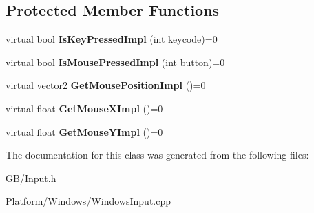 \subsection*{Protected Member Functions}
\begin{DoxyCompactItemize}
\item 
\mbox{\label{class_g_b_1_1_input_a0fa41d7075dbd87cc4cb9420c7758c8b}} 
virtual bool {\bfseries Is\+Key\+Pressed\+Impl} (int keycode)=0
\item 
\mbox{\label{class_g_b_1_1_input_a4a3f8d90dc75709f72c20a8bc43031b3}} 
virtual bool {\bfseries Is\+Mouse\+Pressed\+Impl} (int button)=0
\item 
\mbox{\label{class_g_b_1_1_input_a5e8fe504c109b585197558bac6f0235f}} 
virtual vector2 {\bfseries Get\+Mouse\+Position\+Impl} ()=0
\item 
\mbox{\label{class_g_b_1_1_input_a6c9fdcd1418af88465fc6f0d5cef7b2c}} 
virtual float {\bfseries Get\+Mouse\+X\+Impl} ()=0
\item 
\mbox{\label{class_g_b_1_1_input_a6140b8dde2617ffe59073db1c7be3344}} 
virtual float {\bfseries Get\+Mouse\+Y\+Impl} ()=0
\end{DoxyCompactItemize}


The documentation for this class was generated from the following files\+:\begin{DoxyCompactItemize}
\item 
G\+B/Input.\+h\item 
Platform/\+Windows/Windows\+Input.\+cpp\end{DoxyCompactItemize}
